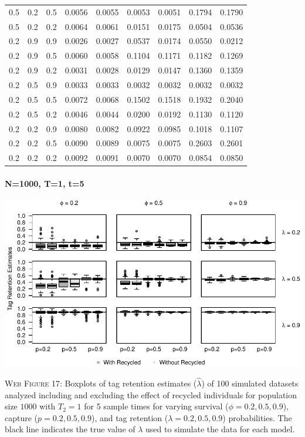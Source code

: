 \documentclass[]{article}
\let\oldparagraph\paragraph
\renewcommand{\paragraph}[1]{\oldparagraph{#1}\mbox{}}
\begin{document}
\begin{table}[ht]
{\begin{tabular}{rrrrrrrrr}
  0.5 & 0.2 & 0.5 & 0.0056 & 0.0055 & 0.0053 & 0.0051 & 0.1794 & 0.1790 \\ 
  0.5 & 0.2 & 0.2 & 0.0064 & 0.0061 & 0.0151 & 0.0175 & 0.0504 & 0.0536 \\ 
  0.2 & 0.9 & 0.9 & 0.0026 & 0.0027 & 0.0537 & 0.0174 & 0.0550 & 0.0212 \\ 
  0.2 & 0.9 & 0.5 & 0.0060 & 0.0058 & 0.1104 & 0.1171 & 0.1182 & 0.1269 \\ 
  0.2 & 0.9 & 0.2 & 0.0031 & 0.0028 & 0.0129 & 0.0147 & 0.1360 & 0.1359 \\ 
  0.2 & 0.5 & 0.9 & 0.0033 & 0.0033 & 0.0032 & 0.0032 & 0.0032 & 0.0032 \\ 
  0.2 & 0.5 & 0.5 & 0.0072 & 0.0068 & 0.1502 & 0.1518 & 0.1932 & 0.2040 \\ 
  0.2 & 0.5 & 0.2 & 0.0046 & 0.0044 & 0.0200 & 0.0192 & 0.1130 & 0.1120 \\ 
  0.2 & 0.2 & 0.9 & 0.0080 & 0.0082 & 0.0922 & 0.0985 & 0.1018 & 0.1107 \\ 
  0.2 & 0.2 & 0.5 & 0.0090 & 0.0089 & 0.0075 & 0.0075 & 0.2603 & 0.2601 \\ 
  0.2 & 0.2 & 0.2 & 0.0092 & 0.0091 & 0.0070 & 0.0070 & 0.0854 & 0.0850 \\ 
   \hline
\end{tabular}
}
\endgroup
\end{table}

\newpage

\paragraph{N=1000, T=1, t=5}\label{n1000-t1-t5-2}

\includegraphics{Appendix_BW_files/figure-latex/figure17_tagretention_GJSTL5-1.pdf}

\textsc{Web Figure 17:} Boxplots of tag retention estimates
(\(\hat{\lambda}\)) of 100 simulated datasets analyzed including and excluding
the effect of recycled individuals for population size \(1000\) with
\(T_2=1\) for 5 sample times for varying survival
(\(\phi=0.2,0.5,0.9\)), capture (\(p=0.2,0.5,0.9\)), and tag retention
(\(\lambda=0.2,0.5,0.9\)) probabilities. The black line indicates the
true value of \(\lambda\) used to simulate the data for each model.
\end{document}
